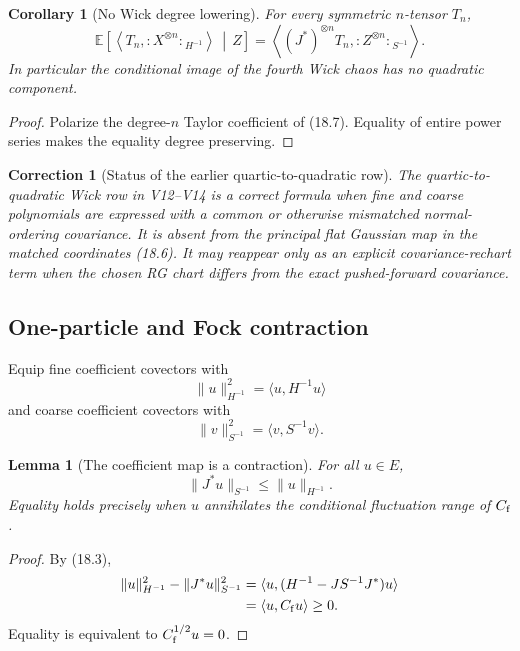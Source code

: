 \documentclass[11pt,oneside]{book}
\newtheorem{lemma}[theorem]{Lemma}
\newtheorem{corollary}[theorem]{Corollary}
\newtheorem{correction}[theorem]{Correction}
\theoremstyle{definition}
\theoremstyle{remark}
\begin{document}
\begin{corollary}[No Wick degree lowering]
\label{cor:e8v18-no-lowering}
For every symmetric \(n\)-tensor \(T_n\),
\[
\boxed{\qquad
\mathbb E\!\left[
  \left\langle T_n,{:X^{\otimes n}:}_{H^{-1}}\right\rangle
  \,\middle|\,Z\right]
=
\left\langle (J^*)^{\otimes n}T_n,
       {:Z^{\otimes n}:}_{S^{-1}}\right\rangle .
\qquad}                                                           \tag{18.8}
\]
In particular the conditional image of the fourth Wick chaos has no
quadratic component.
\end{corollary}

\begin{proof}
Polarize the degree-\(n\) Taylor coefficient of (18.7).  Equality of
entire power series makes the equality degree preserving.
\end{proof}

\begin{correction}[Status of the earlier quartic-to-quadratic row]
\label{corr:e8v18-wick-row}
The quartic-to-quadratic Wick row in V12--V14 is a correct formula when
fine and coarse polynomials are expressed with a common or otherwise
mismatched normal-ordering covariance.  It is absent from the
principal flat Gaussian map in the matched coordinates (18.6).
It may reappear only as an explicit covariance-rechart term when the
chosen RG chart differs from the exact pushed-forward covariance.
\end{correction}

\subsection{One-particle and Fock contraction}

Equip fine coefficient covectors with
\[
             \|u\|_{H^{-1}}^2=\langle u,H^{-1}u\rangle
\]
and coarse coefficient covectors with
\[
             \|v\|_{S^{-1}}^2=\langle v,S^{-1}v\rangle.            \tag{18.9}
\]

\begin{lemma}[The coefficient map is a contraction]
\label{lem:e8v18-one-particle}
For all \(u\in E\),
\[
\boxed{\qquad
        \|J^*u\|_{S^{-1}}\leq\|u\|_{H^{-1}}.
\qquad}                                                           \tag{18.10}
\]
Equality holds precisely when \(u\) annihilates the conditional
fluctuation range of \(C_{\rm f}\).
\end{lemma}

\begin{proof}
By (18.3),
\[
\begin{split}
\|u\|_{H^{-1}}^2-\|J^*u\|_{S^{-1}}^2
 &=\langle u,(H^{-1}-JS^{-1}J^*)u\rangle\\
 &=\langle u,C_{\rm f}u\rangle\geq0.
\end{split}
\]
Equality is equivalent to \(C_{\rm f}^{1/2}u=0\).
\end{proof}
\end{document}
